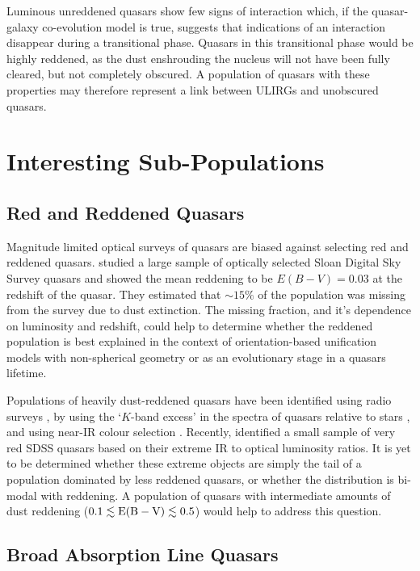 Luminous unreddened quasars show few signs of interaction \citep[e.g.][]{dunlop03} which, if the quasar-galaxy co-evolution model is true, suggests that indications of an interaction disappear during a transitional phase. Quasars in this transitional phase would be highly reddened, as the dust enshrouding the nucleus will not have been fully cleared, but not completely obscured. 
A population of quasars with these properties may therefore represent a link between ULIRGs and unobscured quasars. 

\section{Interesting Sub-Populations}

\subsection{Red and Reddened Quasars}

Magnitude limited optical surveys of quasars are biased against selecting red and reddened quasars. 
\citet{richards03} studied a large sample of optically selected Sloan Digital Sky Survey \citep[SDSS;][]{york00} quasars and showed the mean reddening to be $E(B-V) = 0.03$ at the redshift of the quasar. 
They estimated that $\sim 15\%$ of the population was missing from the survey due to dust extinction. 
The missing fraction, and it's dependence on luminosity and redshift, could help to determine whether the reddened population is best explained in the context of orientation-based unification models with non-spherical geometry or as an evolutionary stage in a quasars lifetime.   

Populations of heavily dust-reddened quasars have been identified using radio surveys \citep[e.g.][]{glikman12}, by using the `$K$-band excess' in the spectra of quasars relative to stars \citep{maddox12}, and using near-IR colour selection \citep{banerji12,banerji13}. 
Recently, \citet{ross14} identified a small sample of very red SDSS quasars based on their extreme IR to optical luminosity ratios. 
It is yet to be determined whether these extreme objects are simply the tail of a population dominated by less reddened quasars, or whether the distribution is bi-modal with reddening. 
A population of quasars with intermediate amounts of dust reddening ($0.1 \lesssim {\rm E(B-V)} \lesssim 0.5$) would help to address this question. 

\subsection{Broad Absorption Line Quasars}

